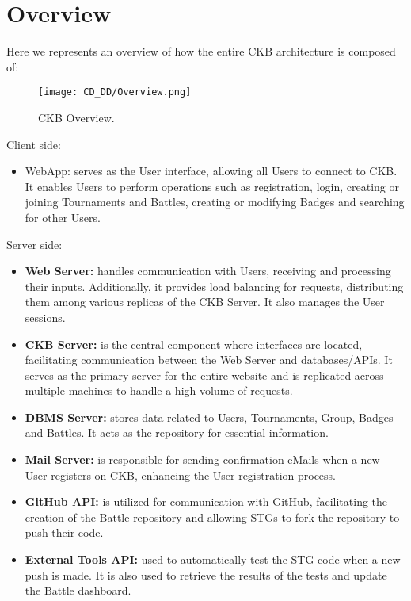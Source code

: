 \section{Overview}
\label{sec:overview}%
Here we represents an overview of how the entire CKB architecture is composed of:

\begin{figure}[H]
    \begin{center}
        \texttt{[image: CD\_DD/Overview.png]}
        \caption{CKB Overview.}
        \label{fig:CKB_overview}%
    \end{center}
\end{figure}

\noindent Client side:
\begin{itemize}
    \item WebApp: serves as the User interface, allowing all Users to connect to CKB. It enables Users to perform operations such as registration, login, creating or joining Tournaments and Battles, creating or modifying Badges and searching for other Users.
\end{itemize}
\noindent Server side:
\begin{itemize}
    \item \textbf{Web Server:} handles communication with Users, receiving and processing their inputs. Additionally, it provides load balancing for requests, distributing them among various replicas of the CKB Server. It also manages the User sessions.
    \item \textbf{CKB Server:} is the central component where interfaces are located, facilitating communication between the Web Server and databases/APIs. It serves as the primary server for the entire website and is replicated across multiple machines to handle a high volume of requests.
    \item \textbf{DBMS Server:} stores data related to Users, Tournaments, Group, Badges and Battles. It acts as the repository for essential information.
    \item \textbf{Mail Server:} is responsible for sending confirmation eMails when a new User registers on CKB, enhancing the User registration process.
    \item \textbf{GitHub API:} is utilized for communication with GitHub, facilitating the creation of the Battle repository and allowing STGs to fork the repository to push their code.
    \item \textbf{External Tools API:} used to automatically test the STG code when a new push is made. It is also used to retrieve the results of the tests and update the Battle dashboard.
\end{itemize}

